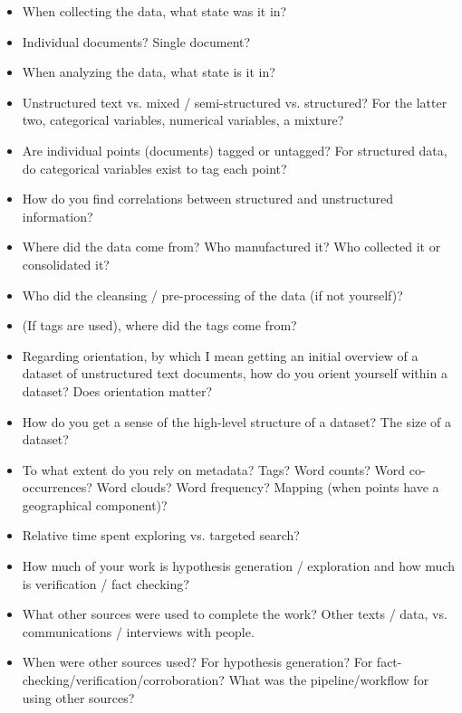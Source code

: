 
\begin{itemize}
    \item When collecting the data, what state was it in?
    \item Individual documents? Single document?
    \item When analyzing the data, what state is it in?
    \item Unstructured text vs. mixed / semi-structured vs. structured? For the latter two, categorical variables, numerical variables, a mixture?
    \item Are individual points (documents) tagged or untagged? For structured data, do categorical variables exist to tag each point?
    \item How do you find correlations between structured and unstructured information?
\end{itemize}


\begin{itemize}
    \item Where did the data come from? Who manufactured it? Who collected it or consolidated it?
    \item Who did the cleansing / pre-processing of the data (if not yourself)? 
    \item (If tags are used), where did the tags come from?
\end{itemize}


\begin{itemize}
    \item Regarding orientation, by which I mean getting an initial overview of a dataset of unstructured text documents, how do you orient yourself within a dataset? Does orientation matter?
    \item How do you get a sense of the high-level structure of a dataset? The size of a dataset?
    \item To what extent do you rely on metadata? Tags? Word counts? Word co-occurrences? Word clouds? Word frequency? Mapping (when points have a geographical component)?
\end{itemize}


\begin{itemize}
    \item Relative time spent exploring vs. targeted search?
    \item How much of your work is hypothesis generation / exploration and how much is verification / fact checking?
    \item What other sources were used to complete the work? Other texts / data, vs. communications / interviews with people.
    \item When were other sources used? For hypothesis generation? For fact-checking/verification/corroboration? What was the pipeline/workflow for using other sources?
\end{itemize}


